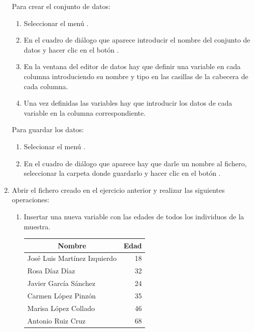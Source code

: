 \begin{enumerate}[leftmargin=*]
\begin{indicacion}
Para crear el conjunto de datos:
\begin{enumerate}
\item Seleccionar el menú .
\item En el cuadro de diálogo que aparece introducir el nombre del conjunto de datos  y hacer clic en el botón .
\item En la ventana del editor de datos hay que definir una variable en cada columna introduciendo su nombre y tipo en las casillas de la cabecera de cada columna.
\item Una vez definidas las variables hay que introducir los datos de cada variable en la columna correspondiente. 
\end{enumerate}
Para guardar los datos:
\begin{enumerate}
\item Selecionar el menú .
\item En el cuadro de diálogo que aparece hay que darle un nombre al fichero, seleccionar la carpeta donde guardarlo y hacer clic en el
botón .
\end{enumerate}
\end{indicacion}

\item Abrir el fichero creado en el ejercicio anterior y realizar las siguientes operaciones:

\begin{enumerate}
\item Insertar una nueva variable  con las edades de todos los individuos de la muestra.
\begin{center}
\begin{tabular}{|l|r|}
\hline
\multicolumn{1}{|c|}{Nombre} & \multicolumn{1}{c|}{Edad} \\
\hline
José Luis Martínez Izquierdo & 18 \\
Rosa Díaz Díaz & 32 \\
Javier García Sánchez & 24 \\
Carmen López Pinzón & 35 \\
Marisa López Collado & 46 \\
Antonio Ruiz Cruz & 68 \\
\hline
\end{tabular}
\end{center}


\end{enumerate}
\end{enumerate}
